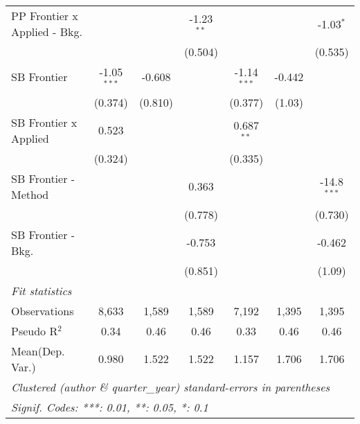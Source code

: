 \begin{tabular}{lcccccc}
   PP Frontier x Applied - Bkg.   &                &                & -1.23$^{**}$  &               &                & -1.03$^{*}$\\   
                                  &                &                & (0.504)       &               &                & (0.535)\\   
   SB Frontier                    & -1.05$^{***}$  & -0.608         &               & -1.14$^{***}$ & -0.442         &   \\   
                                  & (0.374)        & (0.810)        &               & (0.377)       & (1.03)         &   \\   
   SB Frontier x Applied          & 0.523          &                &               & 0.687$^{**}$  &                &   \\   
                                  & (0.324)        &                &               & (0.335)       &                &   \\   
   SB Frontier - Method           &                &                & 0.363         &               &                & -14.8$^{***}$\\   
                                  &                &                & (0.778)       &               &                & (0.730)\\   
   SB Frontier - Bkg.             &                &                & -0.753        &               &                & -0.462\\   
                                  &                &                & (0.851)       &               &                & (1.09)\\   
   \midrule
   \emph{Fit statistics}\\
   Observations                   & 8,633          & 1,589          & 1,589         & 7,192         & 1,395          & 1,395\\  
   Pseudo R$^2$                   & 0.34           & 0.46           & 0.46          & 0.33          & 0.46           & 0.46\\  
Mean(Dep. Var.) & 0.980 & 1.522 & 1.522 & 1.157 & 1.706 & 1.706 \\
   \midrule \midrule
   \multicolumn{7}{l}{\emph{Clustered (author \& quarter\_year) standard-errors in parentheses}}\\
   \multicolumn{7}{l}{\emph{Signif. Codes: ***: 0.01, **: 0.05, *: 0.1}}\\
\end{tabular}
\par\endgroup
